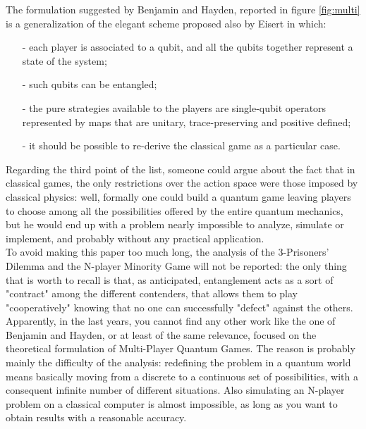 The formulation suggested by Benjamin and Hayden, reported in figure \ref{fig:multi} is a generalization of the elegant scheme proposed also by Eisert \cite{Eisert_2020} in which: 
\begin{itemize}[noitemsep]
\item[-] each player is associated to a qubit, and all the qubits together represent a state of the system;
\item[-] such qubits can be entangled;
\item[-] the pure strategies available to the players are single-qubit operators represented by maps that are unitary, trace-preserving and positive defined;
\item[-] it should be possible to re-derive the classical game as a particular case.
\end{itemize}
Regarding the third point of the list, someone could argue about the fact that in classical games, the only restrictions over the action space were those imposed by classical physics: well, formally one could build a quantum game leaving players to choose among all the possibilities offered by the entire quantum mechanics, but he would end up with a problem nearly impossible to analyze, simulate or implement, and probably without any practical application.\\
To avoid making this paper too much long, the analysis of the 3-Prisoners' Dilemma and the N-player Minority Game will not be reported: the only thing that is worth to recall is that, as anticipated, entanglement acts as a sort of "contract" among the different contenders, that allows them to play "cooperatively" knowing that no one can successfully "defect" against the others.\\
Apparently, in the last years, you cannot find any other work like the one of Benjamin and Hayden, or at least of the same relevance, focused on the theoretical formulation of Multi-Player Quantum Games. The reason is probably mainly the difficulty of the analysis: redefining the problem in a quantum world means basically moving from a discrete to a continuous set of possibilities, with a consequent infinite number of different situations. Also simulating an N-player problem on a classical computer is almost impossible, as long as you want to obtain results with a reasonable accuracy.